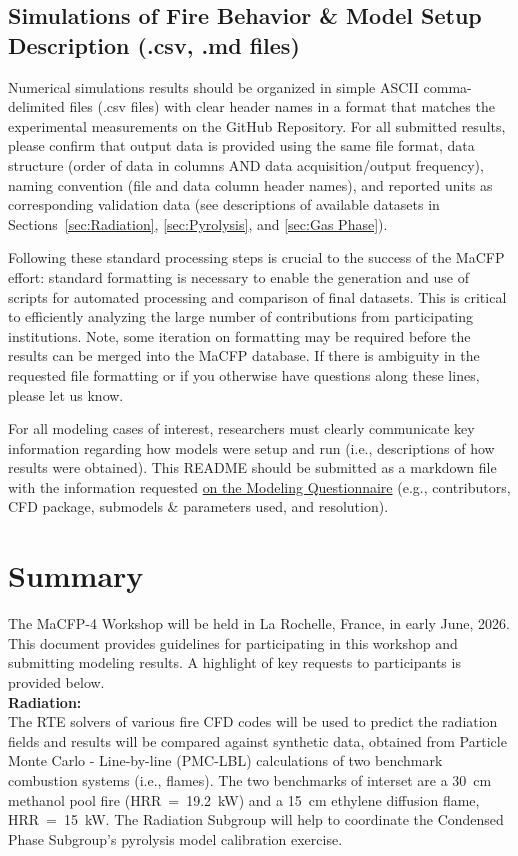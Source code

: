 \documentclass[12pt]{article}
\begin{document}
\clearpage
\subsection{Simulations of Fire Behavior \& Model Setup Description (.csv, .md files)}
Numerical simulations results should be organized in simple ASCII comma-delimited files (.csv files) with clear header names in a format that matches the experimental measurements on the GitHub Repository. For all submitted results, please confirm that output data is provided using the same file format, data structure (order of data in columns AND data acquisition/output frequency), naming convention (file and data column header names), and reported units as corresponding validation data (see descriptions of available datasets in Sections~\ref{sec:Radiation}, \ref{sec:Pyrolysis}, and \ref{sec:Gas Phase}).

Following these standard processing steps is crucial to the success of the MaCFP effort: standard formatting is necessary to enable the generation and use of scripts for automated processing and comparison of final datasets. This is critical to efficiently analyzing the large number of contributions from participating institutions. Note, some iteration on formatting may be required before the results can be merged into the MaCFP database. If there is ambiguity in the requested file formatting or if you otherwise have questions along these lines, please let us know.
 
For all modeling cases of interest, researchers must clearly communicate key information regarding how models were setup and run (i.e., descriptions of how results were obtained). This README should be submitted as a markdown file with the information requested \href{https://github.com/MaCFP/macfp-db/blob/master/Utilities/model_questionnaire.md}{on the Modeling Questionnaire} (e.g., contributors, CFD package, submodels \& parameters used, and resolution).

\clearpage
\section{Summary}
\label{sec:Summary}
The MaCFP-4 Workshop will be held in La Rochelle, France, in early June, 2026. This document provides guidelines for participating in this workshop and submitting modeling results. A highlight of key requests to participants is provided below.\\

\textbf{Radiation:}\\
The RTE solvers of various fire CFD codes will be used to predict the radiation fields and results will be compared against synthetic data, obtained from Particle Monte Carlo - Line-by-line (PMC-LBL) calculations of two benchmark combustion systems (i.e., flames).  The two benchmarks of interset are a 30~cm methanol pool fire (HRR~=~19.2~kW) and a 15~cm ethylene diffusion flame, HRR~=~15~kW. The Radiation Subgroup will  help to coordinate the Condensed Phase Subgroup's pyrolysis model calibration exercise.\\
\end{document}
